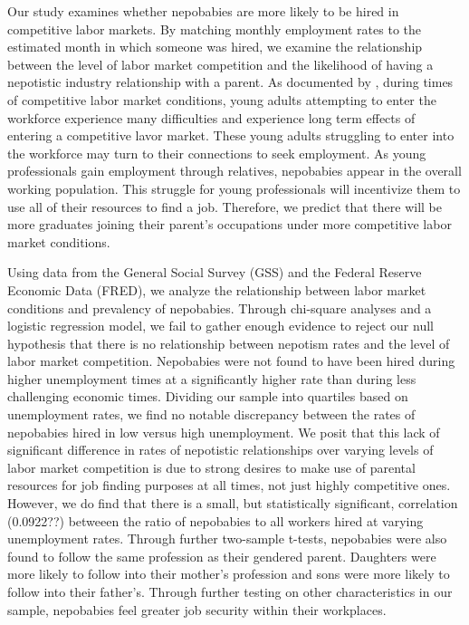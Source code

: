 \documentclass[12pt]{article}
\begin{document}
Our study examines whether nepobabies are more likely to be hired in competitive labor markets. By matching monthly employment rates to the estimated month in which someone was hired, we examine the relationship between the level of labor market competition and the likelihood of having a nepotistic industry relationship with a parent.
As documented by , during times of competitive labor market conditions, young adults attempting to enter the workforce experience many difficulties and experience long term effects of entering a competitive lavor market. These young adults struggling to enter into the workforce may turn to their connections to seek employment. As young professionals gain employment through relatives, nepobabies appear in the overall working population. This struggle for young professionals will incentivize them to use all of their resources to find a job. Therefore, we predict that there will be more graduates joining their parent’s occupations under more competitive labor market conditions. 


Using data from the General Social Survey (GSS) and the Federal Reserve Economic Data (FRED), we analyze the relationship between labor market conditions and prevalency of nepobabies. Through chi-square analyses and a logistic regression model, we fail to gather enough evidence to reject our null hypothesis that there is no relationship between nepotism rates and the level of labor market competition. Nepobabies were not found to have been hired during higher unemployment times at a significantly higher rate than during less challenging economic times. Dividing our sample into  quartiles based on unemployment rates, we find no notable discrepancy between the rates of nepobabies hired in low versus high unemployment. We posit that this lack of significant difference in rates of nepotistic relationships over varying levels of labor market competition is due to strong desires to make use of parental resources for job finding purposes at all times, not just highly competitive ones. However, we do find that there is a small, but statistically significant, correlation (0.0922??) betweeen the ratio of nepobabies to all workers hired at varying unemployment rates. Through further two-sample t-tests, nepobabies were also found to follow the same profession as their gendered parent. Daughters were more likely to follow into their mother's profession and sons were more likely to follow into their father's. Through further testing on other characteristics in our sample, nepobabies feel greater job security within their workplaces.
\end{document}
